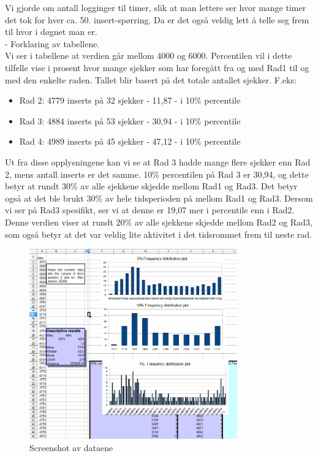 \documentclass[a4paper, norsk, 12pt]{article}
\begin{document}
Vi gjorde om antall logginger til timer, slik at man lettere ser hvor mange timer det tok for hver ca.  50. insert-spørring. Da er det også veldig lett å telle seg frem til hvor i døgnet man er.\\

- Forklaring av tabellene.\\
Vi ser i tabellene at verdien går mellom 4000 og 6000. Percentilen vil i dette tilfelle vise i prosent hvor mange sjekker som har foregått fra og med Rad1 til og med den enkelte raden. Tallet blir basert på det totale antallet sjekker. F.eks:
\begin{itemize}
\item Rad 2: 4779 inserts på 32 sjekker - 11,87 - i 10\% percentile
\item Rad 3: 4884 inserts på 53 sjekker - 30,94 - i 10\% percentile
\item Rad 4: 4989 inserts på 45 sjekker - 47,12 - i 10\% percentile
\end{itemize}

Ut fra disse opplysningene kan vi se at Rad 3 hadde mange flere sjekker enn Rad 2, mens antall inserts er det samme. 10\% percentilen på Rad 3 er 30,94, og dette betyr at rundt 30\% av alle sjekkene skjedde mellom Rad1 og Rad3. Det betyr også at det ble brukt 30\% av hele tidsperioden på mellom Rad1 og Rad3. Dersom vi ser på Rad3 spesifikt, ser vi at denne er 19,07 mer i percentile enn i Rad2. Denne verdien viser at rundt 20\% av alle sjekkene skjedde mellom Rad2 og Rad3, som også betyr at det var veldig lite aktivitet i det tidsrommet frem til neste rad.

\begin{figure}[h!]
 \centering
  \includegraphics[width=0.8\textwidth]{Images/Insert_i_TF_calc.jpg}
 \caption{Screenshot av dataene}
\end{figure}
\end{document}
